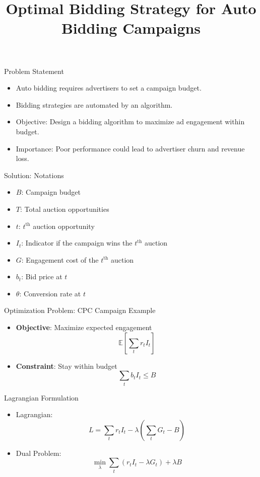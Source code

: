 \documentclass{beamer}
\title{Optimal Bidding Strategy for Auto Bidding Campaigns}
\author{}
\date{}
\begin{document}
	
	\frame{\titlepage}
	
	\begin{frame}{Problem Statement}
		\begin{itemize}
			\item Auto bidding requires advertisers to set a campaign budget.
			\item Bidding strategies are automated by an algorithm.
			\item Objective: Design a bidding algorithm to maximize ad engagement within budget.
			\item Importance: Poor performance could lead to advertiser churn and revenue loss.
		\end{itemize}
	\end{frame}
	
	\begin{frame}{Solution: Notations}
		\begin{itemize}
			\item $B$: Campaign budget
			\item $T$: Total auction opportunities
			\item $t$: $t^{\text{th}}$ auction opportunity
			\item $I_t$: Indicator if the campaign wins the $t^{\text{th}}$ auction
			\item $G$: Engagement cost of the $t^{\text{th}}$ auction
			\item $b_t$: Bid price at $t$
			\item $\theta$: Conversion rate at $t$
		\end{itemize}
	\end{frame}
	
	\begin{frame}{Optimization Problem: CPC Campaign Example}
		\begin{itemize}
			\item \textbf{Objective}: Maximize expected engagement
			\[
			\mathbb{E} \left[ \sum_t r_t I_t \right]
			\]
			\item \textbf{Constraint}: Stay within budget
			\[
			\sum_t b_t I_t \leq B
			\]
		\end{itemize}
	\end{frame}
	
	\begin{frame}{Lagrangian Formulation}
		\begin{itemize}
			\item Lagrangian:
			\[
			L = \sum_t r_t I_t - \lambda \left( \sum_t G_t - B \right)
			\]
			\item Dual Problem:
			\[
			\min_{\lambda} \sum_t \left( r_t I_t - \lambda G_t \right) + \lambda B
			\]
		\end{itemize}
	\end{frame}
	
\end{document}
